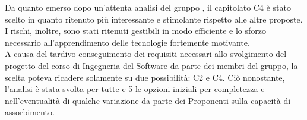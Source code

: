 Da quanto emerso dopo un'attenta analisi del gruppo \GRUPPO, il capitolato C4 è stato scelto in quanto ritenuto più interessante e stimolante rispetto alle altre proposte. I rischi, inoltre, sono stati ritenuti gestibili in modo efficiente e lo sforzo necessario all'apprendimento delle tecnologie fortemente motivante. \\ A causa del tardivo conseguimento dei requisiti necessari allo svolgimento del progetto del corso di Ingegneria del Software da parte dei membri del gruppo, la scelta poteva ricadere solamente su due possibilità: C2 e C4. Ciò nonostante, l'analisi è stata svolta per tutte e 5 le opzioni iniziali per completezza e nell'eventualità di qualche variazione da parte dei Proponenti sulla capacità di assorbimento.

